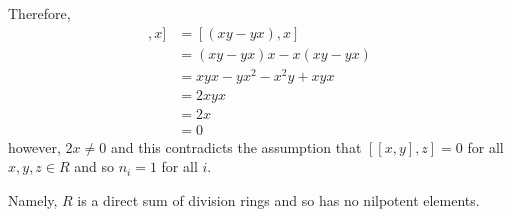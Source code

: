 \documentclass[12pt]{Qual}
\begin{document}
\begin{solution}
Therefore, \begin{align*}
    [[x,y],x]&=[(xy-yx),x]\\
    &=(xy-yx)x-x(xy-yx)\\
    &=xyx-yx^2-x^2y+xyx\\
    &=2xyx\\
    &=2x\\
    &=0
\end{align*} however, $2x\not=0$ and this contradicts the assumption that $[[x,y],z]=0$ for all $x,y,z\in R$ and so $n_i=1$ for all $i.$

Namely, $R$ is a direct sum of division rings and so has no nilpotent elements.
\end{solution}
\newpage
\end{document}
